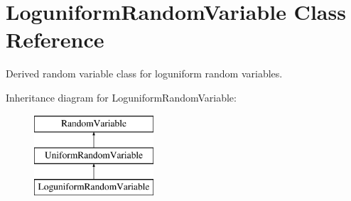 \section{Loguniform\+Random\+Variable Class Reference}
\label{classPecos_1_1LoguniformRandomVariable}


Derived random variable class for loguniform random variables.  


Inheritance diagram for Loguniform\+Random\+Variable\+:\begin{figure}[H]
\begin{center}
\leavevmode
\includegraphics[height=3.000000cm]{classPecos_1_1LoguniformRandomVariable}
\end{center}
\end{figure}
